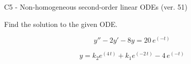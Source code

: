 \begin{exercise}
  \begin{exerciseTitle}C5 - Non-homogeneous second-order linear ODEs (ver. 51)\end{exerciseTitle}
  \begin{exerciseStatement}
    
Find the solution to the given ODE.

    
\[y''-2y'-8y = 20 \, e^{\left(-t\right)}\]

  \end{exerciseStatement}
  \begin{exerciseAnswer}
    
\[y= k_{2} e^{\left(4 \, t\right)} + k_{1} e^{\left(-2 \, t\right)} - 4 \, e^{\left(-t\right)}\]

  \end{exerciseAnswer}
\end{exercise}